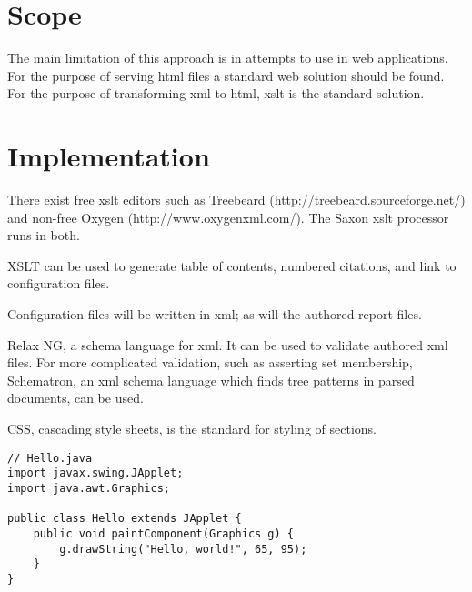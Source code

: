 \documentclass{article}
\begin{document}
%
\section*{Scope}
The main limitation of this approach is in attempts to use in web applications.  For the purpose of serving html files a standard web solution should be found.  For the purpose of transforming xml to html, xslt is the standard solution.  

\section{Implementation}
There exist free xslt editors such as Treebeard (http://treebeard.sourceforge.net/) and non-free Oxygen (http://www.oxygenxml.com/).  The Saxon xslt processor runs in both.   

XSLT can be used to generate table of contents, numbered citations, and link to configuration files.

Configuration files will be written in xml; as will the authored report files.

Relax NG, a schema language for xml.  It can be used to validate authored xml files.  For more complicated validation, such as asserting set membership, Schematron, an xml schema language which finds tree patterns in parsed documents, can be used. 

CSS, cascading style sheets, is the standard for styling of sections. 

\begin{lstlisting}
// Hello.java
import javax.swing.JApplet;
import java.awt.Graphics;

public class Hello extends JApplet {
    public void paintComponent(Graphics g) {
        g.drawString("Hello, world!", 65, 95);
    }    
}
\end{lstlisting}
\end{document}
